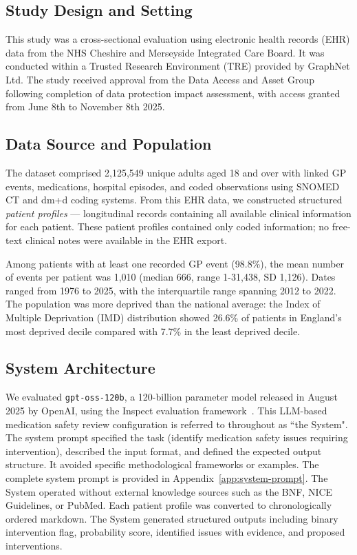 \subsection{Study Design and Setting}

    This study was a cross-sectional evaluation using electronic health records (EHR) data from the NHS Cheshire and Merseyside Integrated Care Board. It was conducted within a Trusted Research Environment (TRE) provided by GraphNet Ltd. The study received approval from the Data Access and Asset Group following completion of data protection impact assessment, with access granted from June 8th to November 8th 2025.

\subsection{Data Source and Population}
    The dataset comprised 2,125,549 unique adults aged 18 and over with linked GP events, medications, hospital episodes, and coded observations using SNOMED CT and dm+d coding systems. From this EHR data, we constructed structured \textit{patient profiles} --- longitudinal records containing all available clinical information for each patient. These patient profiles contained only coded information; no free-text clinical notes were available in the EHR export.

    Among patients with at least one recorded GP event (98.8\%), the mean number of events per patient was 1,010 (median 666, range 1-31,438, SD 1,126). Dates ranged from 1976 to 2025, with the interquartile range spanning 2012 to 2022. The population was more deprived than the national average: the Index of Multiple Deprivation (IMD) distribution showed 26.6\% of patients in England's most deprived decile compared with 7.7\% in the least deprived decile.

\subsection{System Architecture}
    \label{sec:system-architecture}
    We evaluated \texttt{gpt-oss-120b}, a 120-billion parameter model released in August 2025 by OpenAI, using the Inspect evaluation framework~\cite{ukaisecurity2024inspectai}. This LLM-based medication safety review configuration is referred to throughout as ``the System". The system prompt specified the task (identify medication safety issues requiring intervention), described the input format, and defined the expected output structure. It avoided specific methodological frameworks or examples. The complete system prompt is provided in Appendix~\ref{app:system-prompt}. The System operated without external knowledge sources such as  the BNF, NICE Guidelines, or PubMed. Each patient profile was converted to chronologically ordered markdown. The System generated structured outputs including binary intervention flag, probability score, identified issues with evidence, and proposed interventions.


